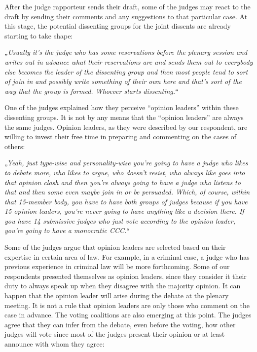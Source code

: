 \documentclass[
  11pt,
]{article}
\begin{document}
After the judge rapporteur sends their draft, some of the judges may react to the draft by sending their comments and any suggestions to that particular case. At this stage, the potential dissenting groups for the joint dissents are already starting to take shape:

\emph{„Usually it's the judge who has some reservations before the plenary session and writes out in advance what their reservations are and sends them out to everybody else becomes the leader of the dissenting group and then most people tend to sort of join in and possibly write something of their own here and that's sort of the way that the group is formed. Whoever starts dissenting.``}

One of the judges explained how they perceive ``opinion leaders'' within these dissenting groups. It is not by any means that the ``opinion leaders'' are always the same judges. Opinion leaders, as they were described by our respondent, are willing to invest their free time in preparing and commenting on the cases of others:

\emph{„Yeah, just type-wise and personality-wise you're going to have a judge who likes to debate more, who likes to argue, who doesn't resist, who always like goes into that opinion clash and then you're always going to have a judge who listens to that and then some even maybe join in or be persuaded. Which, of course, within that 15-member body, you have to have both groups of judges because if you have 15 opinion leaders, you're never going to have anything like a decision there. If you have 14 submissive judges who just vote according to the opinion leader, you're going to have a monocratic CCC.``}

Some of the judges argue that opinion leaders are selected based on their expertise in certain area of law. For example, in a criminal case, a judge who has previous experience in criminal law will be more forthcoming. Some of our respondents presented themselves as opinion leaders, since they consider it their duty to always speak up when they disagree with the majority opinion. It can happen that the opinion leader will arise during the debate at the plenary meeting. It is not a rule that opinion leaders are only those who comment on the case in advance. The voting coalitions are also emerging at this point. The judges agree that they can infer from the debate, even before the voting, how other judges will vote since most of the judges present their opinion or at least announce with whom they agree:
\end{document}
